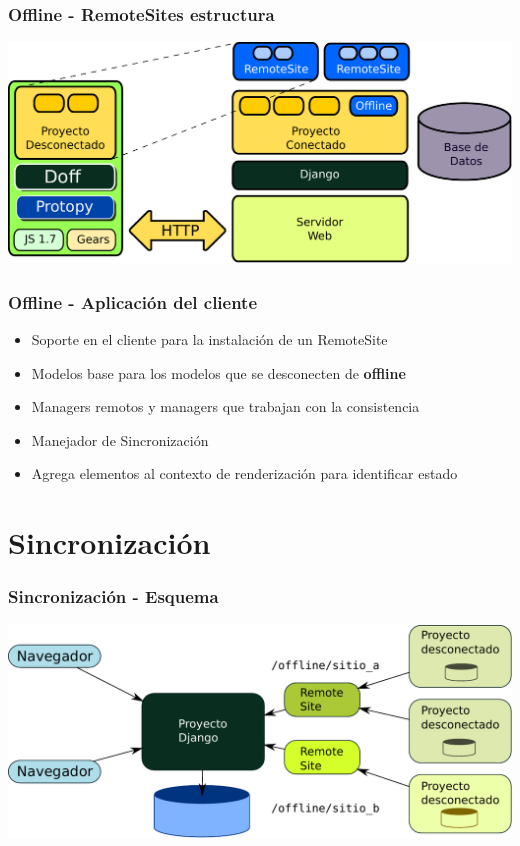\documentclass{beamer}
\begin{document}
\begin{frame}

    \frametitle{Offline - RemoteSites estructura}
    \includegraphics[scale=0.5]{remote_sites.pdf}
    
\end{frame}

\begin{frame}
    \frametitle{Offline - Aplicación del cliente}
    \begin{itemize}
      \item{Soporte en el cliente para la instalación de un RemoteSite}
      \item{Modelos base para los modelos que se desconecten de {\bf offline}}
      \item{Managers remotos y managers que trabajan con la consistencia}
      \item{Manejador de Sincronización}
      \item{Agrega elementos al contexto de renderización para identificar
            estado}
    \end{itemize}
\end{frame}

\section{Sincronización}
\begin{frame}
    \frametitle{Sincronización - Esquema}
    \includegraphics[scale=0.5]{esquema_distribuido.pdf}
\end{frame}
\end{document}
